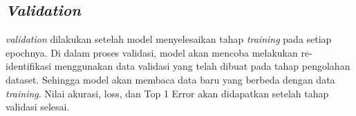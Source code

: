 \subsection{\emph{Validation}}

\emph{validation} dilakukan setelah model menyelesaikan tahap \emph{training} pada setiap epochnya. Di dalam proses 
validasi, model akan mencoba melakukan re-identifikasi menggunakan data validasi yang telah dibuat pada tahap 
pengolahan dataset. Sehingga model akan membaca data baru yang berbeda dengan data \emph{training}. Nilai akurasi, 
loss, dan Top 1 Error akan didapatkan setelah tahap validasi selesai.



